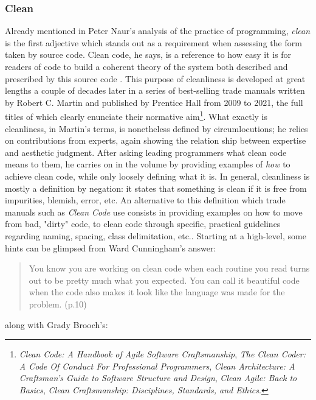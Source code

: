 \subsubsection{Clean}
\label{subsubsec:clean}

Already mentioned in Peter Naur's analysis of the practice of programming, \emph{clean} is the first adjective which stands out as a requirement when assessing the form taken by source code. Clean code, he says, is a reference to how easy it is for readers of code to build a coherent theory of the system both described and prescribed by this source code \citep{naur_programming_1985}. This purpose of cleanliness is developed at great lengths a couple of decades later in a series of best-selling trade manuals written by Robert C. Martin and published by Prentice Hall from 2009 to 2021, the full titles of which clearly enunciate their normative aim\footnote{\emph{Clean Code: A Handbook of Agile Software Craftsmanship}, \emph{The Clean Coder: A Code Of Conduct For Professional Programmers}, \emph{Clean Architecture: A Craftsman's Guide to Software Structure and Design}, \emph{Clean Agile: Back to Basics}, \emph{Clean Craftsmanship: Disciplines, Standards, and Ethics}.}. What exactly is cleanliness, in Martin's terms, is nonetheless defined by circumlocutions; he relies on contributions from experts, again showing the relation ship between expertise and aesthetic judgment. After asking leading programmers what clean code means to them, he carries on in the volume by providing examples of \emph{how} to achieve clean code, while only loosely defining what it is. In general, cleanliness is mostly a definition by negation: it states that something is clean if it is free from impurities, blemish, error, etc. An alternative to this definition which trade manuals such as \emph{Clean Code} use consists in providing examples on how to move from bad, "dirty" code, to clean code through specific, practical guidelines regarding naming, spacing, class delimitation, etc.. Starting at a high-level, some hints can be glimpsed from Ward Cunningham's answer:

\begin{quote}
  You know you are working on clean code when each routine you read turns out to be pretty much what you expected. You can call it beautiful code when the code also makes it look like the language was made for the problem. \citep{martin_clean_2008} (p.10)
\end{quote}

along with Grady Brooch's:

